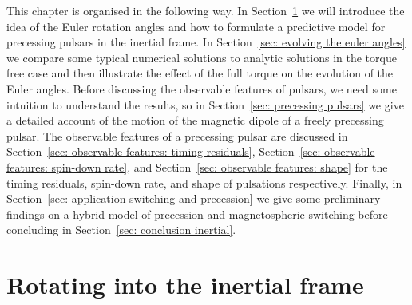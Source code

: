 \documentclass[../full_thesis/full_thesis.tex]{subfiles}
\begin{document}
This chapter is organised in the following way. In Section~\ref{sec: rotating} we
will introduce the idea of the Euler rotation angles and how to formulate a
predictive model for precessing pulsars in the inertial frame. In
Section~\ref{sec: evolving the euler angles} we compare some typical numerical
solutions to analytic solutions in the torque free case and then illustrate the
effect of the full \citet{Deutsch1955} torque on the evolution of the Euler
angles. Before discussing the observable features of pulsars, we need some
intuition to understand the results, so in Section~\ref{sec: precessing pulsars}
we give a detailed account of the motion of the magnetic dipole of a freely
precessing pulsar. The observable features of a precessing pulsar are discussed
in Section~\ref{sec: observable features: timing residuals}, Section~\ref{sec:
observable features: spin-down rate}, and Section~\ref{sec: observable features:
shape} for the timing residuals, spin-down rate, and shape of pulsations
respectively. Finally, in Section~\ref{sec: application switching and precession}
we give some preliminary findings on a hybrid model of precession and
magnetospheric switching before concluding in Section~\ref{sec: conclusion
inertial}.


\section{Rotating into the inertial frame}
\label{sec: rotating}
\end{document}
